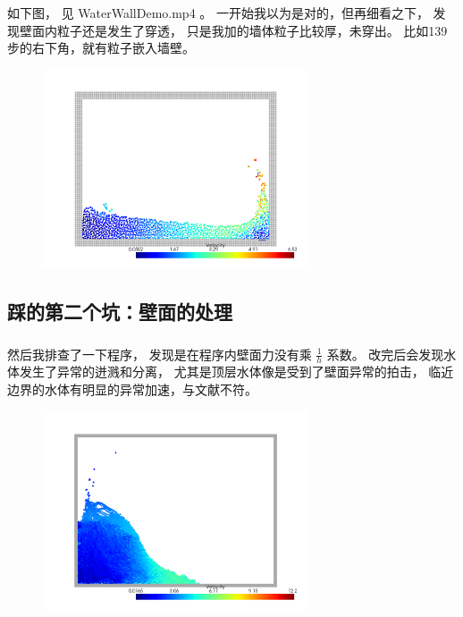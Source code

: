 \begin{frame}
    \frametitle{\subsecname}
    如下图，
    见 WaterWallDemo.mp4 。
    一开始我以为是对的，但再细看之下，
    发现壁面内粒子还是发生了穿透，
    只是我加的墙体粒子比较厚，未穿出。
    比如139步的右下角，就有粒子嵌入墙壁。
    \begin{figure}[H]
        \centering
        \includegraphics[width=0.7\textwidth]{images/first_trial_139.png}
    \end{figure}
\end{frame}

\subsection{踩的第二个坑：壁面的处理}

\begin{frame}
    \frametitle{\subsecname}
    然后我排查了一下程序，
    发现是在程序内壁面力没有乘 $\frac{1}{h}$ 系数。
    改完后会发现水体发生了异常的迸溅和分离，
    尤其是顶层水体像是受到了壁面异常的拍击，
    临近边界的水体有明显的异常加速，与文献不符。
    \begin{figure}[H]
        \centering
        \includegraphics[width=0.7\textwidth]{images/second_trial_316.png}
    \end{figure}
\end{frame}


